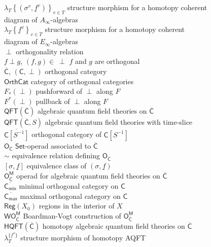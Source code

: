 \documentclass{amsbook}
\numberwithin{section}{chapter}
\numberwithin{subsection}{section}
\numberwithin{equation}{section}
\theoremstyle{plain}
\theoremstyle{definition}
\newcommand{\C}{\mathsf{C}}
\newcommand{\M}{\mathsf{M}}
\renewcommand{\O}{\mathsf{O}}
\newcommand{\W}{\mathsf{W}}
\newcommand{\inv}[1]{{#1}^{-1}}
\newcommand{\perpen}{~\perp}
\newcommand{\Cbar}{\overline{\C}}
\newcommand{\Cbarmin}{\overline{\C_{\mathsf{min}}}}
\newcommand{\Cbarmax}{\overline{\C_{\mathsf{max}}}}
\newcommand{\Csinv}{\C[\inv{S}]}
\newcommand{\Csinvbar}{\overline{\Csinv}}
\newcommand{\Ocbar}{\O_{\Cbar}}
\newcommand{\Ocbarm}{\Ocbar^{\M}}
\newcommand{\Orthcat}{\mathsf{OrthCat}}
\newcommand{\QFT}{\mathsf{QFT}}
\newcommand{\HQFT}{\mathsf{HQFT}}
\newcommand{\Reg}{\mathsf{Reg}}
\newcommand{\Regxzero}{\Reg(X_0)}
\newcommand{\Set}{\mathsf{Set}}
\newcommand{\wocbarm}{\W\Ocbarm}
\newcommand{\uf}{\underline f}
\begin{document}
\begin{tabbing}
$\lambda_T\left\{(\sigma^v,\uf^v)\right\}_{v\in T}$  structure morphism for a homotopy coherent\\ \blob diagram of $A_\infty$-algebras\\
$\lambda_T\left\{\uf^v\right\}_{v\in T}$  structure morphism for a homotopy coherent\\ \blob diagram of $E_\infty$-algebras\\
$\perp$  orthogonality relation\\
$f \perp g$, $(f,g) \in \perpen$  $f$ and $g$ are orthogonal\\
$\Cbar$, $(\C,\perp)$  orthogonal category\\
$\Orthcat$  category of orthogonal categories\\
$F_*(\perp)$  pushforward of $\perp$ along $F$\\
$F^*(\perp)$  pullback of $\perp$ along $F$\\
$\QFT(\Cbar)$  algebraic quantum field theories on $\Cbar$\\
$\QFT(\Cbar,S)$  algebraic quantum field theories with time-slice\\
$\Csinvbar$  orthogonal category of $\Csinv$\\
$\Ocbar$  $\Set$-operad associated to $\Cbar$\\
$\sim$  equivalence relation defining $\Ocbar$\\
$[\sigma,\uf]$  equivalence class of $(\sigma,\uf)$\\
$\Ocbarm$  operad for algebraic quantum field theories on $\Cbar$\\
$\Cbarmin$  minimal orthogonal category on $\C$\\
$\Cbarmax$  maximal orthogonal category on $\C$\\
$\Regxzero$  regions in the interior of $X$\\
$\wocbarm$  Boardman-Vogt construction of $\Ocbarm$\\
$\HQFT(\Cbar)$  homotopy algebraic quantum field theories on $\Cbar$\\
$\lambda_T^{\{f^v\}}$  structure morphism of homotopy AQFT\\

\end{tabbing}
\end{document}

